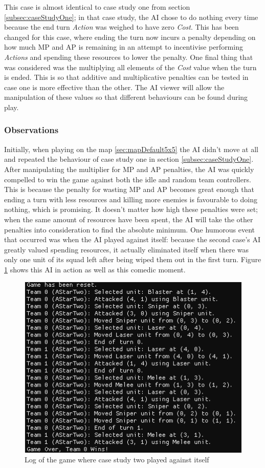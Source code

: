 \documentclass[11pt, a4paper]{report}
\begin{document}
This case is almost identical to case study one from section \ref{subsec:caseStudyOne}; in that case study, the AI chose to do nothing every time because the end turn \emph{Action} was weighed to have zero \emph{Cost}. This has been changed for this case, where ending the turn now incurs a penalty depending on how much MP and AP is remaining in an attempt to incentivise performing \emph{Actions} and spending these resources to lower the penalty. One final thing that was considered was the multiplying all elements of the \emph{Cost} value when the turn is ended. This is so that additive and multiplicative penalties can be tested in case one is more effective than the other. The AI viewer will allow the manipulation of these values so that different behaviours can be found during play. 

\subsubsection{Observations}

Initially, when playing on the map \ref{sec:mapDefault5x5} the AI didn't move at all and repeated the behaviour of case study one in section \ref{subsec:caseStudyOne}. After manipulating the multiplier for MP and AP penalties, the AI was quickly compelled to win the game against both the idle and random team controllers. This is because the penalty for wasting MP and AP becomes great enough that ending a turn with less resources and killing more enemies is favourable to doing nothing, which is promising. It doesn't matter how high these penalties were set; when the same amount of resources have been spent, the AI will take the other penalties into consideration to find the absolute minimum. One humorous event that occurred was when the AI played against itself: because the second case's AI greatly valued spending resources, it actually eliminated itself when there was only one unit of its squad left after being wiped them out in the first turn. Figure \ref{fig:caseStudyTwoSuicide} shows this AI in action as well as this comedic moment.

\begin{figure}[!h]
  \centering
  \includegraphics[width=12cm]{img/case_two_suicide.png}
  \caption{Log of the game where case study two played against itself}
  \label{fig:caseStudyTwoSuicide}
\end{figure}
\end{document}

